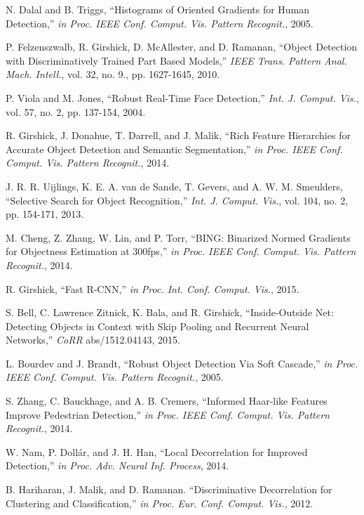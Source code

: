 \documentclass[journal]{IEEEtran}
\begin{document}
\begin{thebibliography}{1}
N. Dalal and B. Triggs, ``Histograms of Oriented Gradients for Human Detection,'' \emph{in Proc. IEEE Conf. Comput. Vis. Pattern Recognit.}, 2005.

P. Felzenszwalb, R. Girshick, D. McAllester, and D. Ramanan, ``Object Detection with Discriminatively Trained Part Based Models,'' \emph{IEEE Trans. Pattern Anal. Mach. Intell.}, vol. 32, no. 9., pp. 1627-1645, 2010.

P. Viola and M. Jones, ``Robust Real-Time Face Detection,'' \emph{Int. J. Comput. Vis.}, vol. 57, no. 2, pp. 137-154, 2004.

R. Girshick, J. Donahue, T. Darrell, and J. Malik, ``Rich Feature Hierarchies for Accurate Object Detection and Semantic Segmentation,'' \emph{in Proc. IEEE Conf. Comput. Vis. Pattern Recognit.}, 2014.

J. R. R. Uijlings, K. E. A. van de Sande, T. Gevers, and A. W. M. Smeulders, ``Selective Search for Object Recognition,'' \emph{Int. J. Comput. Vis.}, vol. 104, no. 2, pp. 154-171, 2013.

M. Cheng, Z. Zhang, W. Lin, and P. Torr, ``BING: Binarized Normed Gradients for Objectness Estimation at 300fps,'' \emph{in Proc. IEEE Conf. Comput. Vis. Pattern Recognit.}, 2014.

R. Girshick, ``Fast R-CNN,'' \emph{in Proc. Int. Conf. Comput. Vis.}, 2015.

S. Bell, C. Lawrence Zitnick, K. Bala, and R. Girshick, ``Inside-Outside Net: Detecting Objects in Context with Skip Pooling and Recurrent Neural Networks,'' \emph{CoRR} abs/1512.04143, 2015.

L. Bourdev and J. Brandt, ``Robust Object Detection Via Soft Cascade,'' \emph{in Proc. IEEE Conf. Comput. Vis. Pattern Recognit.}, 2005.

S. Zhang, C. Bauckhage, and A. B. Cremers, ``Informed Haar-like Features Improve Pedestrian Detection,'' \emph{in Proc. IEEE Conf. Comput. Vis. Pattern Recognit.}, 2014.

W. Nam, P. Doll\'{a}r, and J. H. Han, ``Local Decorrelation for Improved Detection,'' \emph{in Proc. Adv. Neural Inf. Process}, 2014.

B. Hariharan, J. Malik, and D. Ramanan. ``Discriminative Decorrelation for Clustering and Classification,'' \emph{in Proc. Eur. Conf. Comput. Vis.}, 2012.



\end{thebibliography}
\end{document}
